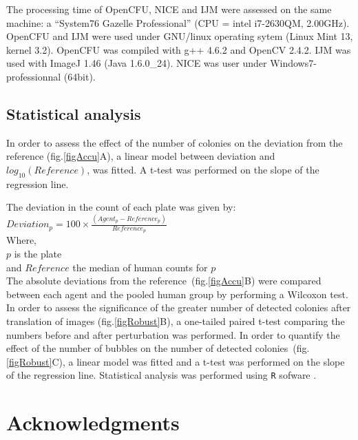 \documentclass[10pt]{article}
\newcommand{\IJM}{IJM}
\begin{document}
The processing time of OpenCFU, NICE and \IJM{} were assessed on the same
machine: a ``System76 Gazelle Professional'' (CPU = intel i7-2630QM,
2.00GHz).
OpenCFU and \IJM{} were used under GNU/linux operating sytem (Linux Mint 13, kernel
3.2).
OpenCFU was compiled with g++ 4.6.2 and OpenCV 2.4.2.
\IJM{} was used with ImageJ 1.46 (Java 1.6.0\_24).
NICE was user under Windows7-professionnal (64bit).

\subsection*{Statistical analysis} 
In order to assess the effect of the
number of colonies on the deviation from the reference (fig.\ref{figAccu}A), a
linear model between deviation and $log_{10} (Reference)$, was fitted.  A t-test
was performed on the slope of the regression line.

The deviation in the count of each plate was given by:\\
\newline{}
$Deviation_p =100\times{}\frac{ (Agent_p-Reference_p)}{Reference_p}$\\
\newline{}
Where,\\
$p$ is the plate\\
and $Reference$ the median of human counts for $p$\\

The absolute deviations from the reference~(fig.\ref{figAccu}B) were compared
between each agent and the pooled human group by performing a Wilcoxon test.
In order to assess the significance of the greater number of detected colonies
after translation of images (fig.\ref{figRobust}B), a  one-tailed paired t-test
comparing the numbers before and after perturbation was performed.
In order to quantify the effect of the number of bubbles on the number of
detected colonies~(fig.\ref{figRobust}C), a linear model was fitted and a t-test
was performed on the slope of the regression line.
Statistical analysis was performed using \texttt{R} sofware\cite{R} .
 
\section*{Acknowledgments}

\newpage{}
\end{document}
